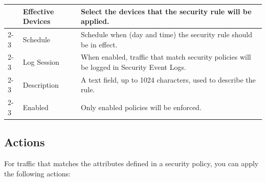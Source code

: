 \begin{longtable}{p{}|p{}|p{}}
                              & Effective Devices & Select the devices that the security rule will be applied.\\ \cline{2-3}
                              & Schedule & Schedule when (day and time) the security rule should be in effect. \\ \cline{2-3}
                              & Log Session & When enabled, traffic that match security policies will be logged in Security Event Logs. \\ \cline{2-3}
                              & Description & A text field, up to 1024 characters, used to describe the rule. \\ \cline{2-3}
                              & Enabled & Only enabled policies will be enforced.\\ \hline                                                                                                 
\end{longtable}

\subsection*{\hypertarget{link:Security Actions}{Actions}}
\label{sec:policies:security:action}

For traffic that matches the attributes defined in a security policy, you can apply the following actions:\\


